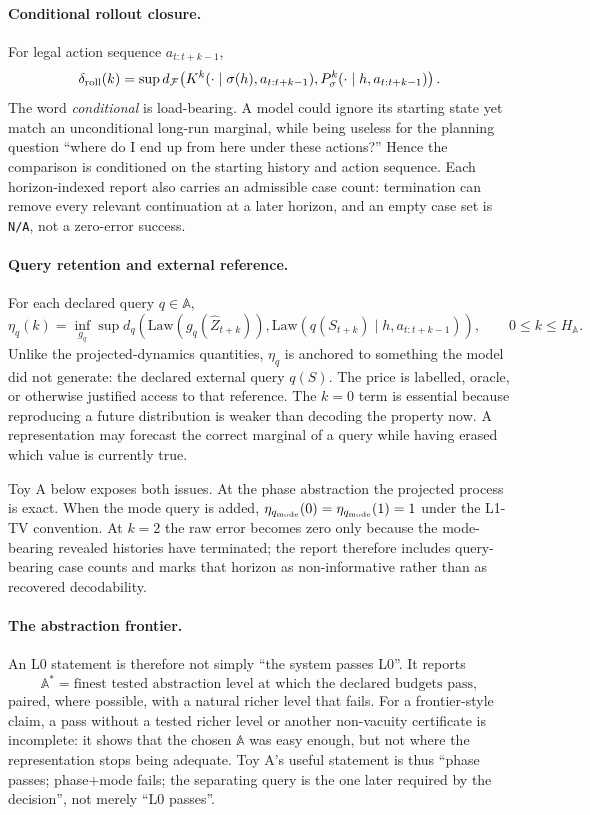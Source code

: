 \documentclass[10pt]{article}
\newcommand{\dF}{d_{\mathcal F}}
\newcommand{\Aabs}{\mathbb A}
\newcommand{\NA}{\texttt{N/A}}
\begin{document}
\paragraph{Conditional rollout closure.}
For legal action sequence $a_{t:t+k-1}$,
\[
\delta_{\rm roll}(k)
=
\sup
\dF\!\left(
K^k(\cdot\mid\sigma(h),a_{t:t+k-1}),
P_\sigma^k(\cdot\mid h,a_{t:t+k-1})
\right).
\]
The word \emph{conditional} is load-bearing. A model could ignore its starting state yet match an unconditional long-run marginal, while being useless for the planning question ``where do I end up from here under these actions?'' Hence the comparison is conditioned on the starting history and action sequence. Each horizon-indexed report also carries an admissible case count: termination can remove every relevant continuation at a later horizon, and an empty case set is \NA, not a zero-error success.

\paragraph{Query retention and external reference.}
For each declared query $q\in\Aabs$,
\[
\eta_q(k)
=
\inf_{g_q}\sup
 d_q\!\left(
\mathrm{Law}(g_q(\hat Z_{t+k})),
\mathrm{Law}(q(S_{t+k})\mid h,a_{t:t+k-1})
\right),
\qquad 0\le k\le H_{\Aabs}.
\]
Unlike the projected-dynamics quantities, $\eta_q$ is anchored to something the model did not generate: the declared external query $q(S)$. The price is labelled, oracle, or otherwise justified access to that reference. The $k=0$ term is essential because reproducing a future distribution is weaker than decoding the property now. A representation may forecast the correct marginal of a query while having erased which value is currently true.

Toy A below exposes both issues. At the phase abstraction the projected process is exact. When the mode query is added, $\eta_{q_{\rm mode}}(0)=\eta_{q_{\rm mode}}(1)=1$ under the L1-TV convention. At $k=2$ the raw error becomes zero only because the mode-bearing revealed histories have terminated; the report therefore includes query-bearing case counts and marks that horizon as non-informative rather than as recovered decodability.

\paragraph{The abstraction frontier.}
An L0 statement is therefore not simply ``the system passes L0''. It reports
\[
\Aabs^*=\text{finest tested abstraction level at which the declared budgets pass},
\]
paired, where possible, with a natural richer level that fails. For a frontier-style claim, a pass without a tested richer level or another non-vacuity certificate is incomplete: it shows that the chosen $\Aabs$ was easy enough, but not where the representation stops being adequate. Toy A's useful statement is thus ``phase passes; phase+mode fails; the separating query is the one later required by the decision'', not merely ``L0 passes''.
\end{document}
